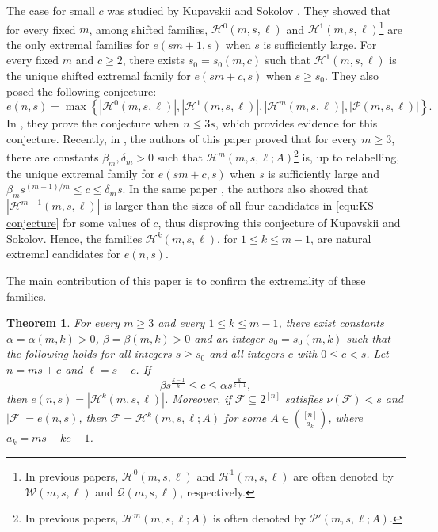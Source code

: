 \documentclass[10pt,a4paper]{article}
\numberwithin{equation}{section}
\newtheorem{theorem}{Theorem}[section]
\theoremstyle{definition}
\newcommand{\F}{\mathcal F}
\begin{document}
The case for small $c$ was studied by Kupavskii and Sokolov \cite{KupavskiiSokolovOtherEnd}.
They showed that for every fixed $m$, among shifted families, $\mathcal H^0(m,s,\ell)$ and $\mathcal H^1(m,s,\ell)$\footnote{In previous papers, $\mathcal H^0(m,s,\ell)$ and $\mathcal H^1(m,s,\ell)$ are often denoted by $\mathcal W(m,s,\ell)$ and $\mathcal Q(m,s,\ell)$, respectively.} are the only extremal families for $e(sm+1,s)$ when $s$ is sufficiently large.  For every fixed $m$ and $c\ge2$, there exists $s_0=s_0(m,c)$ such that $\mathcal H^1(m,s,\ell)$ is the unique shifted extremal family for $e(sm+c,s)$ when $s\ge s_0$.
They also posed the following conjecture:
\begin{equation}\label{equ:KS-conjecture}
        e(n,s)=
        \max\left\{
        |\mathcal H^0(m,s,\ell)|,
        |\mathcal H^1(m,s,\ell)|,
        |\mathcal H^m(m,s,\ell)|,
        |\mathcal P(m,s,\ell)|
        \right\}.
\end{equation}
In \cite{KupavskiiSokolovComplete}, they prove the conjecture when $n \le 3s$, which provides evidence for this conjecture.
Recently, in \cite{ChiWangK2}, the authors of this paper proved that for every $m\ge3$, there are constants $\beta_m,\delta_m>0$ such that $\mathcal H^m(m,s,\ell;A)$\footnote{In previous papers, $\mathcal H^m(m,s,\ell;A)$ is often denoted by $\mathcal P'(m,s,\ell;A)$.} is, up to relabelling, the unique extremal family for $e(sm+c,s)$ when $s$ is sufficiently large and $\beta_ms^{(m-1)/m}\le c\le\delta_ms$.
In the same paper \cite{ChiWangK2}, the authors also showed that $|\mathcal H^{m-1}(m,s,\ell)|$ is larger than the sizes of all four candidates in \eqref{equ:KS-conjecture} for some values of $c$, thus disproving this conjecture of Kupavskii and Sokolov.
Hence, the families $\mathcal H^k(m,s,\ell)$, for $1\le k\le m-1$, are natural extremal candidates for $e(n,s)$.

The main contribution of this paper is to confirm the extremality of these families.

\begin{theorem}\label{thm:main-result-2}
        For every $m\ge3$ and every $1\le k\le m-1$, there exist constants $\alpha=\alpha(m,k)>0$, $\beta=\beta(m,k)>0$ and an integer $s_0=s_0(m,k)$ such that the following holds for all integers $s\ge s_0$ and all integers $c$ with $0\le c<s$.
        Let $n=ms+c$ and $\ell=s-c$.
        If
        \[
                \beta s^{\frac{k-1}{k}}
                \le c\le
                \alpha s^{\frac k{k+1}},
        \]
        then $e(n,s)=|\mathcal H^k(m,s,\ell)|$.
        Moreover, if $\F\subseteq2^{[n]}$ satisfies $\nu(\F)<s$ and $|\F|=e(n,s)$, then $\F=\mathcal H^k(m,s,\ell;A)$ for some $A\in\binom{[n]}{a_k}$, where $a_k=ms-kc-1$.

\end{theorem}
\end{document}
